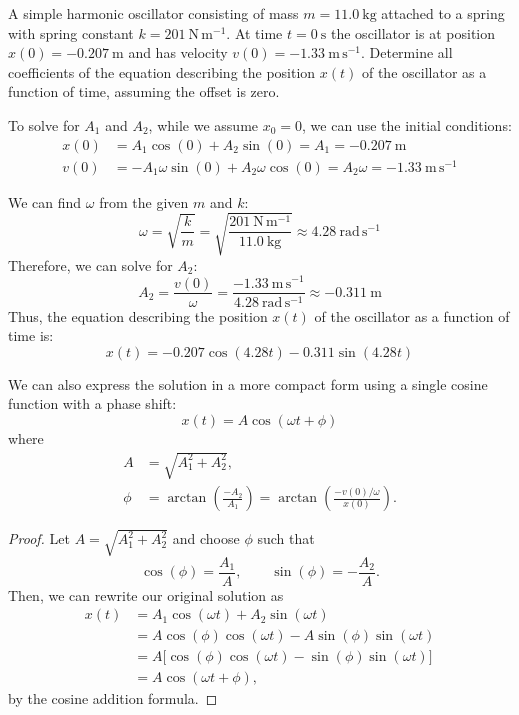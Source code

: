 \documentclass[11pt]{report}
\begin{document}
\begin{example}
    A simple harmonic oscillator consisting of mass \(m = 11.0\ \mathrm{kg}\) attached to a spring with spring constant \(k = 201\ \mathrm{N\,m^{-1}}\). At time \(t=0\ \mathrm{s}\) the oscillator is at position \(x(0) = -0.207\ \mathrm{m}\) and has velocity \(v(0) = -1.33\ \mathrm{m\,s^{-1}}\). Determine all coefficients of the equation describing the position \(x(t)\) of the oscillator as a function of time, assuming the offset is zero. 

    To solve for $A_1$ and $A_2$, while we assume $x_0 = 0$, we can use the initial conditions:
    \begin{align*}
        x(0) &= A_1 \cos(0) + A_2 \sin(0) = A_1 = -0.207\ \mathrm{m} \\
        v(0) &= -A_1 \omega \sin(0) + A_2 \omega \cos(0) = A_2 \omega = -1.33\ \mathrm{m\,s^{-1}}
    \end{align*}

    We can find $\omega$ from the given $m$ and $k$:
    $$
    \omega = \sqrt{\frac{k}{m}} = \sqrt{\frac{201\ \mathrm{N\,m^{-1}}}{11.0\ \mathrm{kg}}} \approx 4.28\ \mathrm{rad\,s^{-1}}
    $$
    Therefore, we can solve for $A_2$:
    $$
    A_2 = \frac{v(0)}{\omega} = \frac{-1.33\ \mathrm{m\,s^{-1}}}{4.28\ \mathrm{rad\,s^{-1}}} \approx -0.311\ \mathrm{m}
    $$
    Thus, the equation describing the position \(x(t)\) of the oscillator as a function of time is:
    $$
    x(t) = -0.207 \cos(4.28 t) - 0.311 \sin(4.28 t)
    $$
\end{example}
\begin{theorem}
We can also express the solution in a more compact form using a single cosine function with a phase shift:
\begin{equation}
    x(t) = A \cos(\omega t + \phi)
\end{equation}
where
\begin{subequations}
    \begin{align}
        A &= \sqrt{A_1^2 + A_2^2}, \\
        \phi &= \arctan\!\left(\frac{-A_2}{A_1}\right) 
              = \arctan\!\left(\frac{-v(0)/\omega}{x(0)}\right).
    \end{align}
\end{subequations}
\end{theorem}

\begin{proof}
Let $A = \sqrt{A_1^2 + A_2^2}$ and choose $\phi$ such that 
\[
\cos(\phi) = \frac{A_1}{A}, \qquad \sin(\phi) = -\frac{A_2}{A}.
\]
Then, we can rewrite our original solution as
\begin{align*}
    x(t) &= A_1 \cos(\omega t) + A_2 \sin(\omega t) \\
         &= A \cos(\phi) \cos(\omega t) - A \sin(\phi) \sin(\omega t) \\
         &= A \big[\cos(\phi)\cos(\omega t) - \sin(\phi)\sin(\omega t)\big] \\ 
         &= A \cos(\omega t + \phi),
\end{align*}
by the cosine addition formula.
\end{proof}
\end{document}
